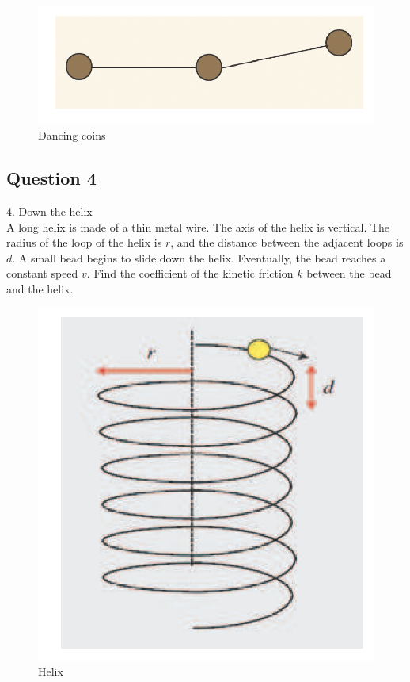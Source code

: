 \documentclass{article}
\begin{document}
\begin{figure}
	\centering
	\includegraphics[width=0.5\linewidth]{spho_book_TYS_images/2015q3.png}
	\caption{Dancing coins}
\end{figure}

\subsection{Question 4}
4. Down the helix \\
A long helix is made of a thin metal wire. The axis of the helix is vertical. The radius of the loop of the helix is $r$, and the distance between the adjacent loops is $d$. A small bead begins to slide down the helix. Eventually, the bead reaches a constant speed $v$. Find the coefficient of the kinetic friction $k$ between the bead and the helix. 

\begin{figure}
	\centering
	\includegraphics[width=0.5\linewidth]{spho_book_TYS_images/2015q4.png}
	\caption{Helix}
\end{figure}
\end{document}
